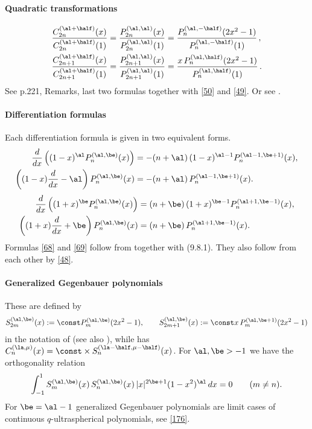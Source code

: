 \documentclass[envcountchap,graybox]{svmono}
\newcounter{rom}
\begin{document}
\paragraph{Quadratic transformations}
\begin{align}
\frac{C_{2n}^{(\al+\half)}(x)}{C_{2n}^{(\al+\half)}(1)}
=\frac{P_{2n}^{(\al,\al)}(x)}{P_{2n}^{(\al,\al)}(1)}
&=\frac{P_n^{(\al,-\half)}(2x^2-1)}{P_n^{(\al,-\half)}(1)}\,,
\label{51}\\
\frac{C_{2n+1}^{(\al+\half)}(x)}{C_{2n+1}^{(\al+\half)}(1)}
=\frac{P_{2n+1}^{(\al,\al)}(x)}{P_{2n+1}^{(\al,\al)}(1)}
&=\frac{x\,P_n^{(\al,\half)}(2x^2-1)}{P_n^{(\al,\half)}(1)}\,.
\label{52}
\end{align}
See p.221, Remarks, last two formulas together with \eqref{50} and \eqref{49}.
Or see .
%
\paragraph{Differentiation formulas}
Each differentiation formula is given in two equivalent forms.
\begin{equation}
\begin{split}
\frac d{dx}\left((1-x)^\al P_n^{(\al,\be)}(x)\right)&=
-(n+\al)\,(1-x)^{\al-1} P_n^{(\al-1,\be+1)}(x),\\
\left((1-x)\frac d{dx}-\al\right)P_n^{(\al,\be)}(x)&=
-(n+\al)\,P_n^{(\al-1,\be+1)}(x).
\end{split}
\label{68}
\end{equation}
%
\begin{equation}
\begin{split}
\frac d{dx}\left((1+x)^\be P_n^{(\al,\be)}(x)\right)&=
(n+\be)\,(1+x)^{\be-1} P_n^{(\al+1,\be-1)}(x),\\
\left((1+x)\frac d{dx}+\be\right)P_n^{(\al,\be)}(x)&=
(n+\be)\,P_n^{(\al+1,\be-1)}(x).
\end{split}
\label{69}
\end{equation}
Formulas \eqref{68} and \eqref{69} follow from
together with (9.8.1). They also follow from each other by \eqref{48}.
%
\paragraph{Generalized Gegenbauer polynomials}
These are defined by
\begin{equation}
S_{2m}^{(\al,\be)}(x):=\const P_m^{(\al,\be)}(2x^2-1),\qquad
S_{2m+1}^{(\al,\be)}(x):=\const x\,P_m^{(\al,\be+1)}(2x^2-1)
\label{70}
\end{equation}
in the notation of 
(see also \cite{K27}), while \cite[Section 1.5.2]{K26}
has $C_n^{(\la,\mu)}(x)=\const\allowbreak\times S_n^{(\la-\half,\mu-\half)}(x)$.
For $\al,\be>-1$ we have the orthogonality relation
\begin{equation}
\int_{-1}^1 S_m^{(\al,\be)}(x)\,S_n^{(\al,\be)}(x)\,|x|^{2\be+1}(1-x^2)^\al\,dx
=0\qquad(m\ne n).
\label{71}
\end{equation}
For $\be=\al-1$ generalized Gegenbauer polynomials are limit cases of
continuous $q$-ultraspherical polynomials, see \eqref{176}.
\end{document}
